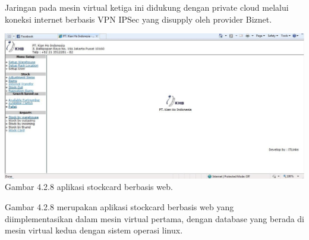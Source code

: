 Jaringan pada mesin virtual ketiga ini didukung dengan private cloud melalui koneksi internet berbasis VPN IPSec yang disupply oleh provider Biznet.
\begin{center}
\includegraphics[scale=0.5]{gambar428.jpg} \\
Gambar 4.2.8 aplikasi stockcard berbasis web.
\end{center}
Gambar 4.2.8 merupakan aplikasi stockcard berbasis web yang  diimplementasikan  dalam  mesin virtual pertama, dengan database yang berada di mesin virtual kedua dengan sistem operasi linux.